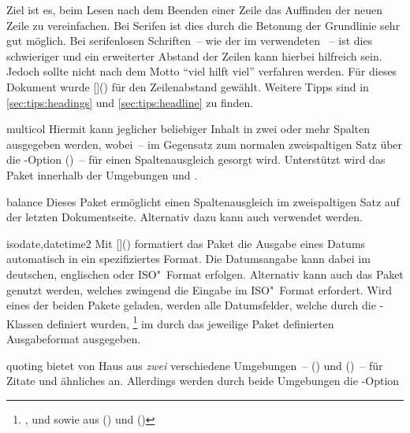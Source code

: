 \begin{packages}
  Ziel ist es, beim Lesen nach dem Beenden einer Zeile das Auffinden der neuen 
  Zeile zu vereinfachen. Bei Serifen ist dies durch die Betonung der Grundlinie 
  sehr gut möglich. Bei serifenlosen Schriften~-- wie der im \TUDCD verwendeten 
  \OpenSans~-- ist dies schwieriger und ein erweiterter Abstand der Zeilen kann 
  hierbei hilfreich sein. Jedoch sollte nicht nach dem Motto 
  \enquote{viel hilft viel} verfahren werden. Für dieses Dokument wurde 
  [\MPValue{\baselinestretch}]() für den 
  Zeilenabstand gewählt. Weitere Tipps sind in \autoref{sec:tips:headings} und 
  \autoref{sec:tips:headline} zu finden.
\item[multicol]
  Hiermit kann jeglicher beliebiger Inhalt in zwei oder mehr Spalten ausgegeben 
  werden, wobei~-- im Gegensatz zum normalen zweispaltigen Satz über die
  \KOMAScript-Option ()~-- für einen 
  Spaltenausgleich gesorgt wird. Unterstützt wird das Paket innerhalb der 
  Umgebungen  und .
\item[balance]
  Dieses Paket ermöglicht einen Spaltenausgleich im zweispaltigen Satz auf der 
  letzten Dokumentseite. Alternativ dazu kann auch  verwendet 
  werden.
\item[isodate,datetime2]
  Mit []() formatiert das 
  Paket  die Ausgabe eines Datums automatisch in ein 
  spezifiziertes Format. Die Datumsangabe kann dabei im deutschen, englischen 
  oder ISO"~Format erfolgen. Alternativ kann auch das Paket 
  genutzt werden, welches zwingend die Eingabe im ISO"~Format erfordert. Wird
  eines der beiden Pakete geladen, werden alle Datumsfelder, welche durch die 
  \TUDScript-Klassen definiert wurden,%
  \footnote{%
    ,  und  sowie aus 
     () und 
    ()%
  }
  im durch das jeweilige Paket definierten Ausgabeformat ausgegeben.
\item[quoting]
   bietet von Haus aus \emph{zwei} verschiedene Umgebungen~-- 
  () und 
  ()~-- für Zitate und ähnliches 
  an. Allerdings werden durch beide Umgebungen die \KOMAScript-Option 

\end{packages}
